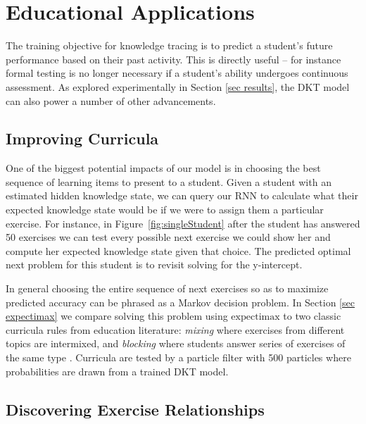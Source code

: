 \section{Educational Applications}

The training objective for knowledge tracing is to predict a student's future performance based on their past activity.
This is directly useful -- for instance formal testing is no longer necessary if a student's ability undergoes continuous assessment.
As explored experimentally in Section \ref{sec results},
the DKT model can also power a number of other advancements.


\subsection{Improving Curricula}

One of the biggest potential impacts of our model is in choosing the best sequence of learning items to present to a student. 
Given a student with an estimated hidden knowledge state, we can query our RNN to calculate what their expected knowledge state would be if we were to assign them a particular exercise.
For instance, in Figure~\ref{fig:singleStudent} after the student has answered 50 exercises we can test every possible next exercise we could show her and compute her expected knowledge state given that choice.
The predicted optimal next problem for this student is to revisit solving for the y-intercept.


In general choosing the entire sequence of next exercises so as to maximize predicted accuracy can be phrased as a Markov decision problem.
In Section \ref{sec expectimax}
we compare solving this problem using $\mathrm{expectimax}$ to two classic curricula rules from education literature: {\em mixing} where exercises from different topics are intermixed, and {\em blocking} where students answer series of exercises of the same type \cite{rohrer2009effects}. Curricula are tested by a particle filter with 500 particles where probabilities are drawn from a trained DKT model. 





\subsection{Discovering Exercise Relationships}

